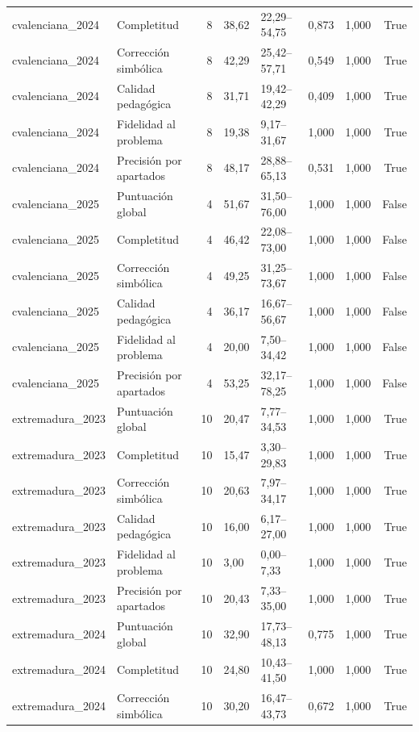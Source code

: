 \begin{tabular}{llrllllr}
cvalenciana\_2024 & Completitud & 8 & 38,62 & 22,29–54,75 & 0,873 & 1,000 & True \\
cvalenciana\_2024 & Corrección simbólica & 8 & 42,29 & 25,42–57,71 & 0,549 & 1,000 & True \\
cvalenciana\_2024 & Calidad pedagógica & 8 & 31,71 & 19,42–42,29 & 0,409 & 1,000 & True \\
cvalenciana\_2024 & Fidelidad al problema & 8 & 19,38 & 9,17–31,67 & 1,000 & 1,000 & True \\
cvalenciana\_2024 & Precisión por apartados & 8 & 48,17 & 28,88–65,13 & 0,531 & 1,000 & True \\
cvalenciana\_2025 & Puntuación global & 4 & 51,67 & 31,50–76,00 & 1,000 & 1,000 & False \\
cvalenciana\_2025 & Completitud & 4 & 46,42 & 22,08–73,00 & 1,000 & 1,000 & False \\
cvalenciana\_2025 & Corrección simbólica & 4 & 49,25 & 31,25–73,67 & 1,000 & 1,000 & False \\
cvalenciana\_2025 & Calidad pedagógica & 4 & 36,17 & 16,67–56,67 & 1,000 & 1,000 & False \\
cvalenciana\_2025 & Fidelidad al problema & 4 & 20,00 & 7,50–34,42 & 1,000 & 1,000 & False \\
cvalenciana\_2025 & Precisión por apartados & 4 & 53,25 & 32,17–78,25 & 1,000 & 1,000 & False \\
extremadura\_2023 & Puntuación global & 10 & 20,47 & 7,77–34,53 & 1,000 & 1,000 & True \\
extremadura\_2023 & Completitud & 10 & 15,47 & 3,30–29,83 & 1,000 & 1,000 & True \\
extremadura\_2023 & Corrección simbólica & 10 & 20,63 & 7,97–34,17 & 1,000 & 1,000 & True \\
extremadura\_2023 & Calidad pedagógica & 10 & 16,00 & 6,17–27,00 & 1,000 & 1,000 & True \\
extremadura\_2023 & Fidelidad al problema & 10 & 3,00 & 0,00–7,33 & 1,000 & 1,000 & True \\
extremadura\_2023 & Precisión por apartados & 10 & 20,43 & 7,33–35,00 & 1,000 & 1,000 & True \\
extremadura\_2024 & Puntuación global & 10 & 32,90 & 17,73–48,13 & 0,775 & 1,000 & True \\
extremadura\_2024 & Completitud & 10 & 24,80 & 10,43–41,50 & 1,000 & 1,000 & True \\
extremadura\_2024 & Corrección simbólica & 10 & 30,20 & 16,47–43,73 & 0,672 & 1,000 & True \\

\end{tabular}
